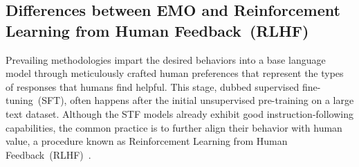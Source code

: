 \subsection{Differences between EMO and Reinforcement Learning from Human Feedback~(RLHF)}
\label{appendix:rlhf}
Prevailing methodologies impart the desired behaviors into a base language model through meticulously crafted human preferences that represent the types of responses that humans find helpful. This stage, dubbed supervised fine-tuning~(SFT), often happens after the initial unsupervised pre-training on a large text dataset. 
Although the STF models already exhibit good instruction-following capabilities, the common practice is to further align their behavior with human value, a procedure known as Reinforcement Learning from Human Feedback~(RLHF)~\citep{christiano2017deep,ziegler2019fine,bai2022constitutional}. 

